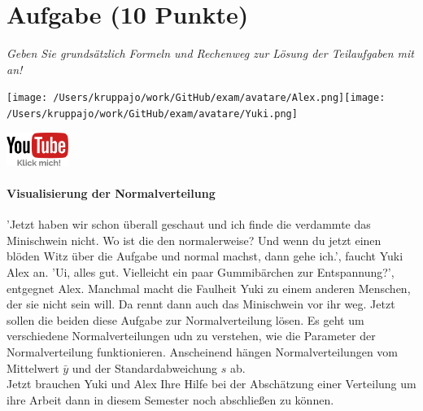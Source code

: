\documentclass[a4paper, 9pt]{scrartcl}\usepackage[]{graphicx}\usepackage[]{xcolor}
\begin{document}
\section{Aufgabe \hfill (10 Punkte)}

\textit{Geben Sie grundsätzlich Formeln und Rechenweg zur Lösung der Teilaufgaben mit an!} \\[1Ex]
 

 
\begin{minipage}[t]{0.5\textwidth}
\texttt{[image: /Users/kruppajo/work/GitHub/exam/avatare/Alex.png]}\hspace{-4mm}\texttt{[image: /Users/kruppajo/work/GitHub/exam/avatare/Yuki.png]}
\end{minipage}
\begin{minipage}[t]{0.5\textwidth}
\hfill
\href{https://youtu.be/ZrJhn2wPbq4}{\includegraphics[width = 2cm]{img/youtube}}
\end{minipage}



\paragraph{Visualisierung der Normalverteilung}

'Jetzt haben wir schon überall geschaut und ich finde die verdammte das Minischwein nicht. Wo ist die den normalerweise? Und wenn du jetzt einen blöden Witz über die Aufgabe und normal machst, dann gehe ich.', faucht Yuki Alex an. 'Ui, alles gut. Vielleicht ein paar Gummibärchen zur Entspannung?', entgegnet Alex. Manchmal macht die Faulheit Yuki zu einem anderen Menschen, der sie nicht sein will. Da rennt dann auch das Minischwein vor ihr weg. Jetzt sollen die beiden diese Aufgabe zur Normalverteilung lösen. Es geht um verschiedene Normalverteilungen udn zu verstehen, wie die Parameter der Normalverteilung funktionieren. Anscheinend hängen Normalverteilungen vom Mittelwert $\bar{y}$ und der Standardabweichung $s$ ab.\\



Jetzt brauchen Yuki und Alex Ihre Hilfe bei der Abschätzung einer Verteilung um ihre Arbeit dann in diesem Semester noch abschließen zu können.
\end{document}
